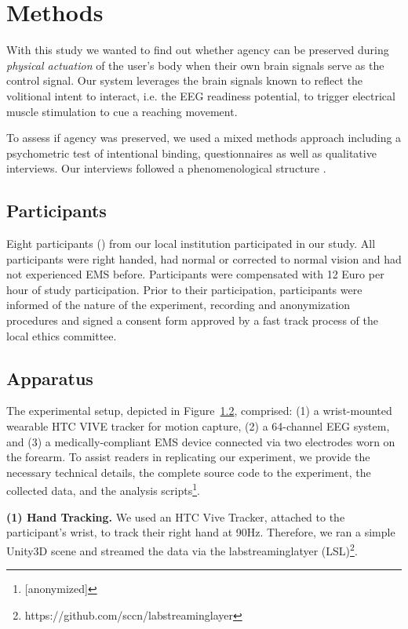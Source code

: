 
\section{Methods}

With this study we wanted to find out whether agency can be preserved during \textit{physical actuation} of the user's body when their own brain signals serve as the control signal. Our system leverages the brain signals known to reflect the volitional intent to interact, i.e. the EEG readiness potential, to trigger electrical muscle stimulation to cue a reaching movement.

To assess if agency was preserved, we used a mixed methods approach including a psychometric test of intentional binding, questionnaires as well as qualitative interviews. Our interviews followed a phenomenological structure .

\subsection{Participants}

 Eight participants () from our local institution participated in our study. All participants were right handed, had normal or corrected to normal vision and had not experienced EMS before. Participants were compensated with 12 Euro per hour of study participation. Prior to their participation, participants were informed of the nature of the experiment, recording and anonymization procedures and signed a consent form approved by a fast track process of the local ethics committee.

\subsection{Apparatus}
The experimental setup, depicted in Figure~\ref{}, comprised: (1) a wrist-mounted wearable HTC VIVE tracker for motion capture, (2) a 64-channel EEG system, and (3) a medically-compliant EMS device connected via two electrodes worn on the forearm. To assist readers in replicating our experiment, we provide the necessary technical details, the complete source code to the experiment, the collected data, and the analysis scripts\footnote{[anonymized]}.

\indent\textbf{(1) Hand Tracking.} We used an HTC Vive Tracker, attached to the participant's wrist, to track their right hand at 90Hz. Therefore, we ran a simple Unity3D scene and streamed the data via the labstreaminglatyer (LSL)\footnote{https://github.com/sccn/labstreaminglayer}.

